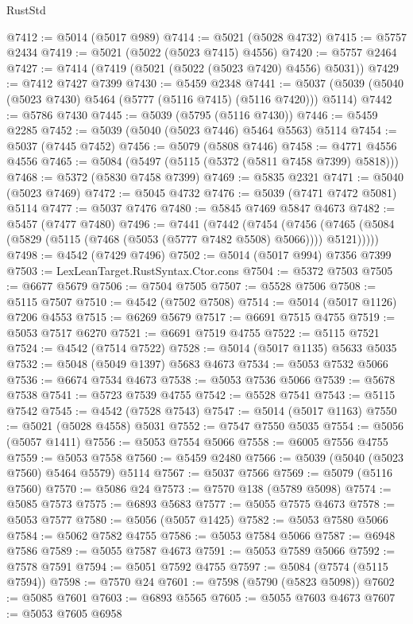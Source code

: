 \begin{lexlean}{RustStd}
\begin{coremodule}
@7412 := @5014 (@5017 @989)
@7414 := @5021 (@5028 @4732)
@7415 := @5757 @2434
@7419 := @5021 (@5022 (@5023 @7415) @4556)
@7420 := @5757 @2464
@7427 := @7414 (@7419 (@5021 (@5022 (@5023 @7420) @4556) @5031))
@7429 := @7412 @7427 @7399
@7430 := @5459 @2348
@7441 := @5037 (@5039 (@5040 (@5023 @7430) @5464 (@5777 (@5116 @7415) (@5116 @7420))) @5114)
@7442 := @5786 @7430
@7445 := @5039 (@5795 (@5116 @7430))
@7446 := @5459 @2285
@7452 := @5039 (@5040 (@5023 @7446) @5464 @5563) @5114
@7454 := @5037 (@7445 @7452)
@7456 := @5079 (@5808 @7446)
@7458 := @4771 @4556 @4556
@7465 := @5084 (@5497 (@5115 (@5372 (@5811 @7458 @7399) @5818)))
@7468 := @5372 (@5830 @7458 @7399)
@7469 := @5835 @2321
@7471 := @5040 (@5023 @7469)
@7472 := @5045 @4732
@7476 := @5039 (@7471 @7472 @5081) @5114
@7477 := @5037 @7476
@7480 := @5845 @7469 @5847 @4673
@7482 := @5457 (@7477 @7480)
@7496 := @7441
    (@7442
      (@7454
        (@7456 (@7465 (@5084 (@5829 (@5115 (@7468 (@5053 (@5777 @7482 @5508) @5066)))) @5121)))))
@7498 := @4542 (@7429 @7496)
@7502 := @5014 (@5017 @994) @7356 @7399
@7503 := LexLeanTarget.RustSyntax.Ctor.cons
@7504 := @5372 @7503
@7505 := @6677 @5679
@7506 := @7504 @7505
@7507 := @5528 @7506
@7508 := @5115 @7507
@7510 := @4542 (@7502 @7508)
@7514 := @5014 (@5017 @1126) @7206 @4553
@7515 := @6269 @5679
@7517 := @6691 @7515 @4755
@7519 := @5053 @7517 @6270
@7521 := @6691 @7519 @4755
@7522 := @5115 @7521
@7524 := @4542 (@7514 @7522)
@7528 := @5014 (@5017 @1135) @5633 @5035
@7532 := @5048 (@5049 @1397) @5683 @4673
@7534 := @5053 @7532 @5066
@7536 := @6674 @7534 @4673
@7538 := @5053 @7536 @5066
@7539 := @5678 @7538
@7541 := @5723 @7539 @4755
@7542 := @5528 @7541
@7543 := @5115 @7542
@7545 := @4542 (@7528 @7543)
@7547 := @5014 (@5017 @1163)
@7550 := @5021 (@5028 @4558) @5031
@7552 := @7547 @7550 @5035
@7554 := @5056 (@5057 @1411)
@7556 := @5053 @7554 @5066
@7558 := @6005 @7556 @4755
@7559 := @5053 @7558
@7560 := @5459 @2480
@7566 := @5039 (@5040 (@5023 @7560) @5464 @5579) @5114
@7567 := @5037 @7566
@7569 := @5079 (@5116 @7560)
@7570 := @5086 @24
@7573 := @7570 @138 (@5789 @5098)
@7574 := @5085 @7573
@7575 := @6893 @5683
@7577 := @5055 @7575 @4673
@7578 := @5053 @7577
@7580 := @5056 (@5057 @1425)
@7582 := @5053 @7580 @5066
@7584 := @5062 @7582 @4755
@7586 := @5053 @7584 @5066
@7587 := @6948 @7586
@7589 := @5055 @7587 @4673
@7591 := @5053 @7589 @5066
@7592 := @7578 @7591
@7594 := @5051 @7592 @4755
@7597 := @5084 (@7574 (@5115 @7594))
@7598 := @7570 @24
@7601 := @7598 (@5790 (@5823 @5098))
@7602 := @5085 @7601
@7603 := @6893 @5565
@7605 := @5055 @7603 @4673
@7607 := @5053 @7605 @6958

\end{coremodule}
\end{lexlean}
